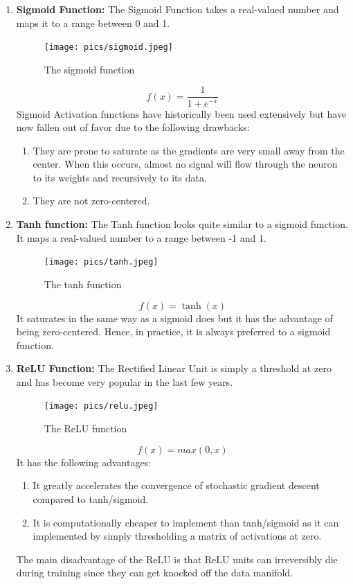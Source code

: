 \documentclass[twoside]{article}
\begin{document}
\begin{enumerate}

\item \textbf{Sigmoid Function:}
The Sigmoid Function takes a real-valued number and maps it to a range between 0 and 1.
\begin{figure}[!htb]
\centering
\texttt{[image: pics/sigmoid.jpeg]}
\caption{The sigmoid function\cite{cs231n-website}}
\label{fig:sigmoid}
\end{figure}
\begin{equation*}
f(x) = \frac{1}{1+e^{-x}}
\end{equation*}
Sigmoid Activation functions have historically been used extensively but have now fallen out of favor due to the following drawbacks:
\begin{enumerate}
\item They are prone to saturate as the gradients are very small away from the center. When this occurs, almost no signal will flow through the neuron to its weights and recursively to its data.
\item They are not zero-centered.
\end{enumerate}

\item \textbf{Tanh function:}
The Tanh function looks quite similar to a sigmoid function. It maps a real-valued number to a range between -1 and 1.
\begin{figure}[!htb]
\centering
\texttt{[image: pics/tanh.jpeg]}
\caption{The tanh function\cite{cs231n-website}}
\label{fig:tanh}
\end{figure}
\begin{equation*}
f(x) = \tanh(x)
\end{equation*}
It saturates in the same way as a sigmoid does but it has the advantage of being zero-centered. Hence, in practice, it is always preferred to a sigmoid function.

\item \textbf{ReLU Function:}
The Rectified Linear Unit is simply a threshold at zero and has become very popular in the last few years.
\begin{figure}[!htb]
\centering
\texttt{[image: pics/relu.jpeg]}
\caption{The ReLU function\cite{cs231n-website}}
\label{fig:ReLU}
\end{figure}
\begin{equation*}
f(x) = max( 0, x )
\end{equation*}
It has the following advantages:
\begin{enumerate}
\item It greatly accelerates the convergence of stochastic gradient descent compared to tanh/sigmoid.
\item It is computationally cheaper to implement than tanh/sigmoid as it can implemented by simply thresholding a matrix of activations at zero.
\end{enumerate}
The main disadvantage of the ReLU is that ReLU units can irreversibly die during training since they can get knocked off the data manifold.


\end{enumerate}
\end{document}
